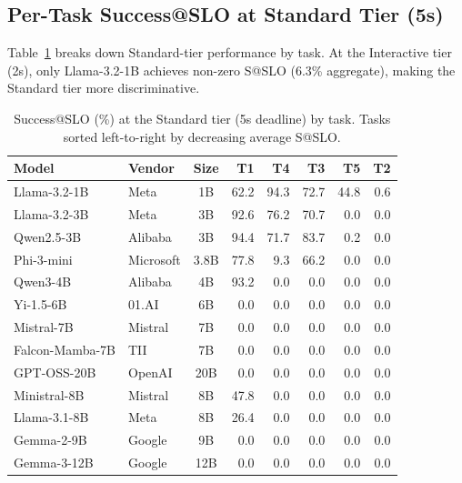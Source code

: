 \documentclass[11pt]{article}
\begin{document}
\subsection{Per-Task Success@SLO at Standard Tier (5s)}

Table~\ref{tab:per-task} breaks down Standard-tier performance by task.  At the Interactive tier (2s), only Llama-3.2-1B achieves non-zero S@SLO (6.3\% aggregate), making the Standard tier more discriminative.

\begin{table}[t]
\centering
\caption{Success@SLO (\%) at the Standard tier (5s deadline) by task.  Tasks sorted left-to-right by decreasing average S@SLO.}
\label{tab:per-task}
\small
\begin{tabular}{llc rrrrr}
\toprule
\textbf{Model} & \textbf{Vendor} & \textbf{Size} & \textbf{T1} & \textbf{T4} & \textbf{T3} & \textbf{T5} & \textbf{T2} \\
\midrule
Llama-3.2-1B    & Meta      & 1B   & 62.2 & 94.3 & 72.7 & 44.8 & 0.6  \\
Llama-3.2-3B    & Meta      & 3B   & 92.6 & 76.2 & 70.7 & 0.0  & 0.0  \\
Qwen2.5-3B      & Alibaba   & 3B   & 94.4 & 71.7 & 83.7 & 0.2  & 0.0  \\
Phi-3-mini       & Microsoft & 3.8B & 77.8 & 9.3  & 66.2 & 0.0  & 0.0  \\
Qwen3-4B         & Alibaba   & 4B   & 93.2 & 0.0  & 0.0  & 0.0  & 0.0  \\
Yi-1.5-6B        & 01.AI     & 6B   & 0.0  & 0.0  & 0.0  & 0.0  & 0.0  \\
Mistral-7B       & Mistral   & 7B   & 0.0  & 0.0  & 0.0  & 0.0  & 0.0  \\
Falcon-Mamba-7B  & TII       & 7B   & 0.0  & 0.0  & 0.0  & 0.0  & 0.0  \\
GPT-OSS-20B      & OpenAI    & 20B  & 0.0  & 0.0  & 0.0  & 0.0  & 0.0  \\
Ministral-8B     & Mistral   & 8B   & 47.8 & 0.0  & 0.0  & 0.0  & 0.0  \\
Llama-3.1-8B     & Meta      & 8B   & 26.4 & 0.0  & 0.0  & 0.0  & 0.0  \\
Gemma-2-9B       & Google    & 9B   & 0.0  & 0.0  & 0.0  & 0.0  & 0.0  \\
Gemma-3-12B      & Google    & 12B  & 0.0  & 0.0  & 0.0  & 0.0  & 0.0  \\
\bottomrule
\end{tabular}
\end{table}
\end{document}
